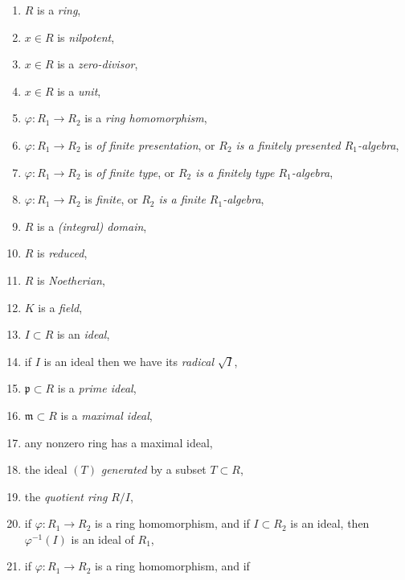 \begin{enumerate}
\item $R$ is a {\it ring},
\label{ring}
\item $x\in R$ is {\it nilpotent},
\label{ring-element-nilpotent}
\item $x\in R$ is a {\it zero-divisor},
\label{ring-element-zerodivisor}
\item $x\in R$ is a {\it unit},
\label{ring-element-unit}
\item $\varphi : R_1 \to R_2$ is a {\it ring homomorphism},
\label{ring-homomorphism}
\item $\varphi : R_1 \to R_2$ is {\it of finite presentation}, or
{\it $R_2$ is a finitely presented $R_1$-algebra},
\label{ring-homomorphism-finite-presentation}
\item $\varphi : R_1 \to R_2$ is {\it of finite type}, or
{\it $R_2$ is a finitely type $R_1$-algebra},
\label{ring-homomorphism-finite-type}
\item $\varphi : R_1 \to R_2$ is {\it finite}, or
{\it $R_2$ is a finite $R_1$-algebra},
\label{ring-homomorphism-finite}
\item $R$ is a {\it (integral) domain},
\label{ring-domain}
\item $R$ is {\it reduced},
\label{ring-reduced}
\item $R$ is {\it Noetherian},
\label{ring-Noetherian}
\item $K$ is a {\it field},
\label{field}
\item $I \subset R$ is an {\it ideal},
\label{ideal}
\item if $I$ is an ideal then we have its {\it radical} $\sqrt{I}$,
\label{radical-ideal}
\item $\mathfrak p \subset R$ is a {\it prime ideal},
\label{prime-ideal}
\item $\mathfrak m \subset R$ is a {\it maximal ideal},
\label{maximal-ideal}
\item any nonzero ring has a maximal ideal,
\label{exists-maximal-ideal}
\item the ideal $(T)$ {\it generated} by a subset $T \subset R$,
\label{ideal-generated-by}
\item the {\it quotient ring} $R/I$,
\label{quotient-ring}
\item if $\varphi : R_1 \to R_2$ is a ring homomorphism, and if
$I \subset R_2$ is an ideal, then $\varphi^{-1}(I)$ is an
ideal of $R_1$,
\label{inverse-image-ideal}
\item if $\varphi : R_1 \to R_2$ is a ring homomorphism, and if

\end{enumerate}
